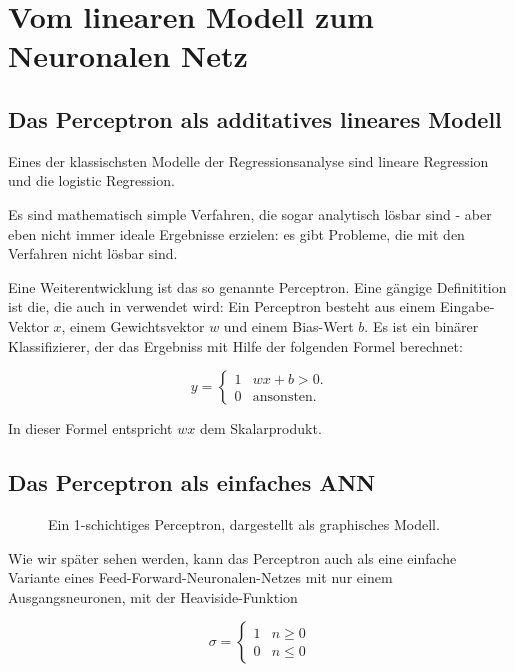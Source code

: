 ﻿\section{Vom linearen Modell zum Neuronalen Netz}

\subsection{Das Perceptron als additatives lineares Modell}
Eines der klassischsten Modelle der Regressionsanalyse sind lineare Regression und die logistic Regression. 

Es sind mathematisch simple Verfahren, die sogar analytisch lösbar sind - aber eben nicht immer ideale Ergebnisse erzielen: es gibt Probleme, die mit den Verfahren nicht lösbar sind. 

Eine Weiterentwicklung ist das so genannte Perceptron.
Eine gängige Definitition ist die, die auch in \cite{bishop1995neural} verwendet wird: 
Ein Perceptron besteht aus einem Eingabe-Vektor $x$, einem Gewichtsvektor $w$ und einem Bias-Wert $b$. Es ist ein binärer Klassifizierer, der das Ergebniss mit Hilfe der folgenden Formel berechnet:

\begin{equation}
\label{eq:perceptron}
    y = \begin{cases}
               1               & w x + b > 0.\\
               0               & \text{ansonsten}. %
           \end{cases} 
\end{equation}

In dieser Formel entspricht $wx$ dem Skalarprodukt.

\subsection{Das Perceptron als einfaches ANN}

\begin{figure}[ht!]
\label{fig:SLP}
  \centering
    
  \caption{Ein 1-schichtiges Perceptron, dargestellt als graphisches Modell.}
\end{figure}

Wie wir später sehen werden, kann das Perceptron auch als eine einfache Variante eines Feed-Forward-Neuronalen-Netzes mit nur einem Ausgangsneuronen, mit der Heaviside-Funktion

\begin{equation}
    \sigma = \begin{cases}
               1               & n \geq 0\\
               0               & n \leq 0
           \end{cases}
\end{equation}


